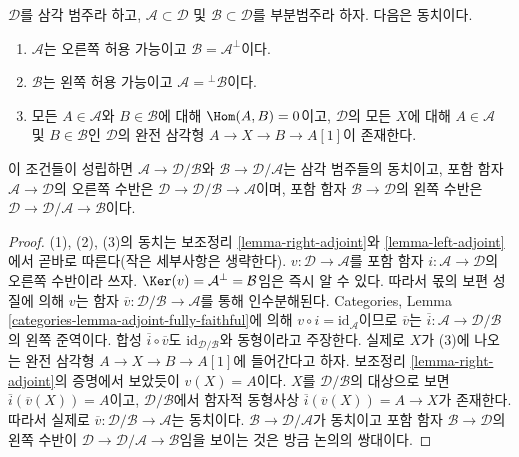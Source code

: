 \begin{proposition}
\label{proposition-summarize-admissible}
$\mathcal{D}$를 삼각 범주라 하고,
$\mathcal{A} \subset \mathcal{D}$ 및 $\mathcal{B} \subset \mathcal{D}$를
부분범주라 하자. 다음은 동치이다.
\begin{enumerate}
\item $\mathcal{A}$는 오른쪽 허용 가능이고
$\mathcal{B} = \mathcal{A}^\perp$이다.
\item $\mathcal{B}$는 왼쪽 허용 가능이고
$\mathcal{A} = {}^\perp\mathcal{B}$이다.
\item 모든 $A \in \mathcal{A}$와 $B \in \mathcal{B}$에 대해
$\Hom(A, B) = 0$이고, $\mathcal{D}$의 모든 $X$에 대해
$A \in \mathcal{A}$ 및 $B \in \mathcal{B}$인 $\mathcal{D}$의
완전 삼각형 $A \to X \to B \to A[1]$이 존재한다.
\end{enumerate}
이 조건들이 성립하면 $\mathcal{A} \to \mathcal{D}/\mathcal{B}$와
$\mathcal{B} \to \mathcal{D}/\mathcal{A}$는 삼각 범주들의 동치이고,
포함 함자 $\mathcal{A} \to \mathcal{D}$의 오른쪽 수반은
$\mathcal{D} \to \mathcal{D}/\mathcal{B} \to \mathcal{A}$이며,
포함 함자 $\mathcal{B} \to \mathcal{D}$의 왼쪽 수반은
$\mathcal{D} \to \mathcal{D}/\mathcal{A} \to \mathcal{B}$이다.
\end{proposition}

\begin{proof}
(1), (2), (3)의 동치는 보조정리 \ref{lemma-right-adjoint}와
\ref{lemma-left-adjoint}에서 곧바로 따른다(작은 세부사항은 생략한다).
$v : \mathcal{D} \to \mathcal{A}$를 포함 함자
$i : \mathcal{A} \to \mathcal{D}$의 오른쪽 수반이라 쓰자.
$\Ker(v) = \mathcal{A}^\perp = \mathcal{B}$임은 즉시 알 수 있다.
따라서 몫의 보편 성질에 의해 $v$는 함자
$\overline{v} : \mathcal{D}/\mathcal{B} \to \mathcal{A}$를 통해
인수분해된다. Categories, Lemma
\ref{categories-lemma-adjoint-fully-faithful}에 의해
$v \circ i = \text{id}_\mathcal{A}$이므로 $\overline{v}$는
$\overline{i} : \mathcal{A} \to \mathcal{D}/\mathcal{B}$의 왼쪽
준역이다. 합성 $\overline{i} \circ \overline{v}$도
$\text{id}_{\mathcal{D}/\mathcal{B}}$와 동형이라고 주장한다.
실제로 $X$가 (3)에 나오는 완전 삼각형
$A \to X \to B \to A[1]$에 들어간다고 하자. 보조정리
\ref{lemma-right-adjoint}의 증명에서 보았듯이 $v(X) = A$이다.
$X$를 $\mathcal{D}/\mathcal{B}$의 대상으로 보면
$\overline{i}(\overline{v}(X)) = A$이고, $\mathcal{D}/\mathcal{B}$에서
함자적 동형사상 $\overline{i}(\overline{v}(X)) = A \to X$가 존재한다.
따라서 실제로 $\overline{v} : \mathcal{D}/\mathcal{B} \to \mathcal{A}$는
동치이다. $\mathcal{B} \to \mathcal{D}/\mathcal{A}$가 동치이고 포함
함자 $\mathcal{B} \to \mathcal{D}$의 왼쪽 수반이
$\mathcal{D} \to \mathcal{D}/\mathcal{A} \to \mathcal{B}$임을 보이는
것은 방금 논의의 쌍대이다.
\end{proof}

